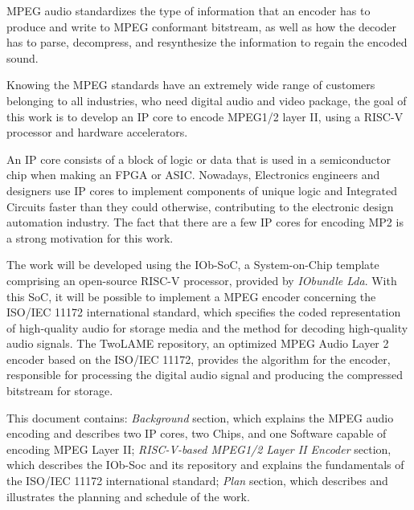 
MPEG audio standardizes the type of information that an encoder has to produce and write to MPEG conformant bitstream, as well as how the decoder has to parse, decompress, and resynthesize the information to regain the encoded sound.


Knowing the MPEG standards have an extremely wide range of customers belonging to all industries, who need digital audio and video package, the goal of this work is to develop an IP core to encode MPEG1/2 layer II, using a RISC-V processor and hardware accelerators.

An IP core consists of a block of logic or data that is used in a semiconductor chip when making an FPGA or ASIC.
Nowadays, Electronics engineers and designers use IP cores to implement components of unique logic and Integrated Circuits faster than they could otherwise, contributing to the electronic design automation industry. The fact that there are a few IP cores for encoding MP2 is a strong motivation for this work.

The work will be developed using the IOb-SoC, a System-on-Chip template comprising an open-source RISC-V processor, provided by \textit{IObundle Lda}. 
With this SoC, it will be possible to implement a MPEG encoder concerning the ISO/IEC 11172 international standard, which specifies the coded representation of high-quality audio for storage media and the method for decoding high-quality audio signals. The TwoLAME repository, an optimized MPEG Audio Layer 2 encoder based on the ISO/IEC 11172, provides the algorithm for the encoder, responsible for processing the digital audio signal and producing the compressed bitstream for storage.

This document contains: \textit{Background} section, which explains the MPEG audio encoding and describes two IP cores, two Chips, and one Software capable of encoding MPEG Layer II; \textit{RISC-V-based MPEG1/2 Layer II Encoder} section, which describes the IOb-Soc and its repository and explains the fundamentals of the ISO/IEC 11172 international standard; \textit{Plan} section, which describes and illustrates the planning and schedule of the work.
